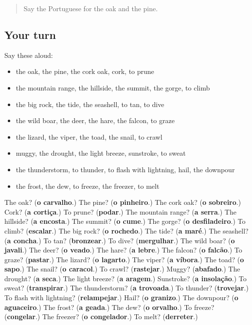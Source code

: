 \label{lesson:PT-R464-revisao-457-464}



\begin{quote}
Say the Portuguese for the oak and the pine.
\end{quote}

\subsection*{Your turn}
Say these aloud:

\begin{itemize}
\raggedright
  \item the oak, the pine, the cork oak, cork, to prune
  \item the mountain range, the hillside, the summit, the gorge, to climb
  \item the big rock, the tide, the seashell, to tan, to dive
  \item the wild boar, the deer, the hare, the falcon, to graze
  \item the lizard, the viper, the toad, the snail, to crawl
  \item muggy, the drought, the light breeze, sunstroke, to sweat
  \item the thunderstorm, to thunder, to flash with lightning, hail, the downpour
  \item the frost, the dew, to freeze, the freezer, to melt
\end{itemize}

\begin{tcolorbox}[breakable,colback=teal!4,colframe=teal!35!black,title={Before you move on}]
The oak? (\textbf{o carvalho}.) The pine? (\textbf{o pinheiro}.) The cork oak? (\textbf{o sobreiro}.) Cork? (\textbf{a cortiça}.) To prune? (\textbf{podar}.) The mountain range? (\textbf{a serra}.) The hillside? (\textbf{a encosta}.) The summit? (\textbf{o cume}.) The gorge? (\textbf{o desfiladeiro}.) To climb? (\textbf{escalar}.) The big rock? (\textbf{o rochedo}.) The tide? (\textbf{a maré}.) The seashell? (\textbf{a concha}.) To tan? (\textbf{bronzear}.) To dive? (\textbf{mergulhar}.) The wild boar? (\textbf{o javali}.) The deer? (\textbf{o veado}.) The hare? (\textbf{a lebre}.) The falcon? (\textbf{o falcão}.) To graze? (\textbf{pastar}.) The lizard? (\textbf{o lagarto}.) The viper? (\textbf{a víbora}.) The toad? (\textbf{o sapo}.) The snail? (\textbf{o caracol}.) To crawl? (\textbf{rastejar}.) Muggy? (\textbf{abafado}.) The drought? (\textbf{a seca}.) The light breeze? (\textbf{a aragem}.) Sunstroke? (\textbf{a insolação}.) To sweat? (\textbf{transpirar}.) The thunderstorm? (\textbf{a trovoada}.) To thunder? (\textbf{trovejar}.) To flash with lightning? (\textbf{relampejar}.) Hail? (\textbf{o granizo}.) The downpour? (\textbf{o aguaceiro}.) The frost? (\textbf{a geada}.) The dew? (\textbf{o orvalho}.) To freeze? (\textbf{congelar}.) The freezer? (\textbf{o congelador}.) To melt? (\textbf{derreter}.)
\end{tcolorbox}
